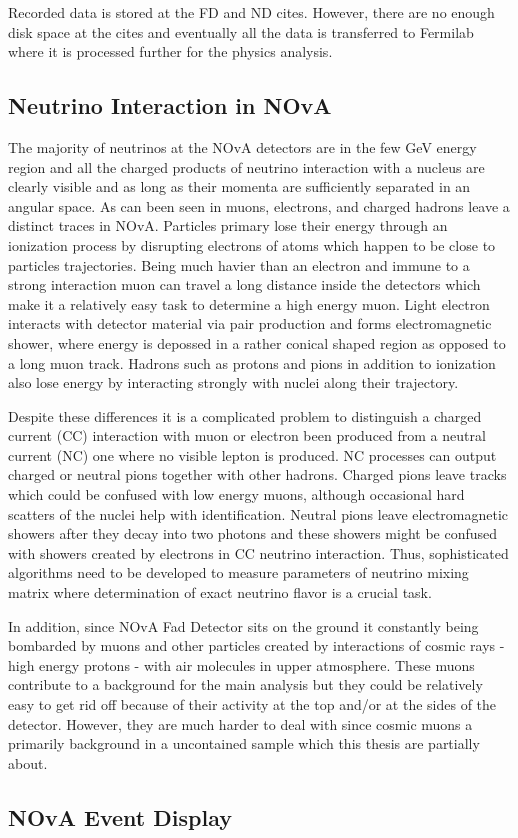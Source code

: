 Recorded data is stored at the FD and ND cites. However, there are no enough disk space at the cites and
eventually all the data is transferred to Fermilab where it is processed further for the physics analysis.

\subsection{Neutrino Interaction in NOvA}
The majority of neutrinos at the NOvA detectors are in the few GeV energy region and all the charged 
products of neutrino interaction with a nucleus are clearly visible and as long as their momenta are 
sufficiently separated in an angular space. As can been seen in \p{} muons, electrons, and charged 
hadrons leave a distinct traces in NOvA. Particles primary lose their energy through an ionization 
process by disrupting electrons of atoms which happen to be close to particles trajectories. Being 
much havier than an electron and immune to a strong interaction muon can travel a long distance inside 
the detectors which make it a relatively easy task to determine a high energy muon. Light electron interacts
with detector material via pair production and forms electromagnetic shower, where energy is depossed in 
a rather conical shaped region as opposed to a long muon track. Hadrons such as protons and pions in 
addition to ionization also lose energy by interacting strongly with nuclei along their trajectory. 

Despite these differences it is a complicated problem to distinguish a charged current (CC) interaction with 
muon or electron been produced from a neutral current (NC) one where no visible lepton is produced.
NC processes can output charged or neutral pions together with other hadrons. Charged pions
leave tracks which could be confused with low energy muons, although occasional hard scatters of the 
nuclei help with identification. Neutral pions leave electromagnetic showers after they decay into two
photons and these showers might be confused with showers created by electrons in CC neutrino interaction.
Thus, sophisticated algorithms need to be developed to measure parameters of neutrino mixing matrix where 
determination of exact neutrino flavor is a crucial task.

In addition, since NOvA Fad Detector sits on the ground it constantly being bombarded by muons and other
particles created by interactions of cosmic rays - high energy protons - with air molecules in upper atmosphere. 
These muons contribute to a background for the main analysis but they could be relatively easy to get rid off
because of their activity at the top and/or at the sides of the detector. However, they are much harder to deal
with since cosmic muons a primarily background in a uncontained sample which this thesis are partially about.

\subsection{NOvA Event Display}

